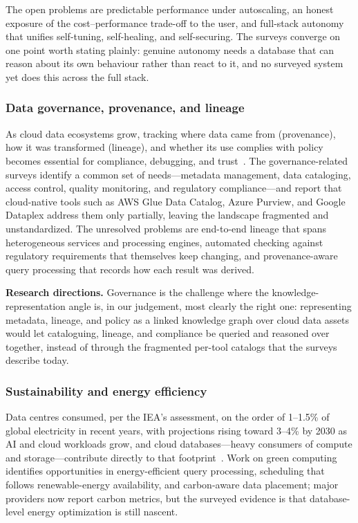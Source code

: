\documentclass[a4paper,fleqn]{cas-sc}
\begin{document}
The open problems are predictable performance under autoscaling, an honest exposure of the cost--performance trade-off to the user, and full-stack autonomy that unifies self-tuning, self-healing, and self-securing. The surveys converge on one point worth stating plainly: genuine autonomy needs a database that can reason about its own behaviour rather than react to it, and no surveyed system yet does this across the full stack.

\subsubsection{Data governance, provenance, and lineage}
\label{subsubsec:governance}

As cloud data ecosystems grow, tracking where data came from (provenance), how it was transformed (lineage), and whether its use complies with policy becomes essential for compliance, debugging, and trust~\cite{Halevy2016Goods}. The governance-related surveys identify a common set of needs---metadata management, data cataloging, access control, quality monitoring, and regulatory compliance---and report that cloud-native tools such as AWS Glue Data Catalog, Azure Purview, and Google Dataplex address them only partially, leaving the landscape fragmented and unstandardized. The unresolved problems are end-to-end lineage that spans heterogeneous services and processing engines, automated checking against regulatory requirements that themselves keep changing, and provenance-aware query processing that records how each result was derived.

\textbf{Research directions.} Governance is the challenge where the knowledge-representation angle is, in our judgement, most clearly the right one: representing metadata, lineage, and policy as a linked knowledge graph over cloud data assets would let cataloguing, lineage, and compliance be queried and reasoned over together, instead of through the fragmented per-tool catalogs that the surveys describe today.

\subsubsection{Sustainability and energy efficiency}
\label{subsubsec:sustainability}

Data centres consumed, per the IEA's assessment, on the order of 1--1.5\% of global electricity in recent years, with projections rising toward 3--4\% by 2030 as AI and cloud workloads grow, and cloud databases---heavy consumers of compute and storage---contribute directly to that footprint~\cite{IEA2024DataCenters}. Work on green computing identifies opportunities in energy-efficient query processing, scheduling that follows renewable-energy availability, and carbon-aware data placement; major providers now report carbon metrics, but the surveyed evidence is that database-level energy optimization is still nascent.
\end{document}
